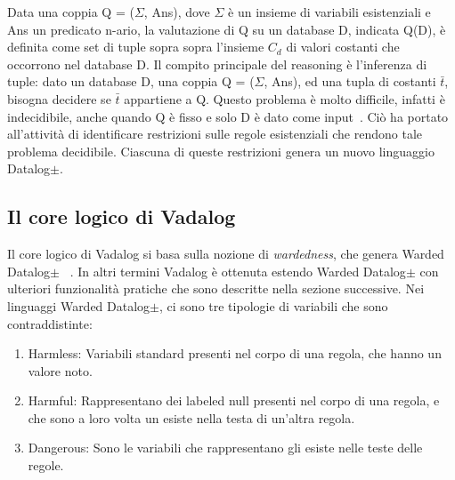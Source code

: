 Data una coppia Q = ($\Sigma$, Ans), dove $\Sigma$ è un insieme di variabili esistenziali e Ans un predicato n-ario, la valutazione di Q su un database D, indicata Q(D), è definita come set di tuple sopra sopra l'insieme $C_{d}$ di valori costanti che occorrono nel database D. \newline
Il compito principale del reasoning è l'inferenza di tuple: dato un database D, una coppia Q = ($\Sigma$, Ans), ed una tupla di costanti $\bar{t}$, bisogna decidere se $\bar{t}$ appartiene a Q. Questo problema è molto difficile, infatti è indecidibile, anche quando Q è fisso e solo D è dato come input~\cite{cali2013taming}. \newline
Ciò ha portato all'attività di identificare restrizioni sulle regole esistenziali che rendono tale problema decidibile. Ciascuna di queste restrizioni genera un nuovo linguaggio Datalog$\pm$. \newline

\subsection{Il core logico di Vadalog}

Il core logico di Vadalog si basa sulla nozione di \textit{wardedness}, che genera Warded Datalog$\pm$ ~\cite{gottlob2015beyond}. \newline
In altri termini Vadalog è ottenuta estendo Warded Datalog$\pm$ con ulteriori funzionalità pratiche che sono descritte nella sezione successive. \newline
Nei linguaggi Warded Datalog$\pm$, ci sono tre tipologie di variabili che sono contraddistinte:

\begin{enumerate}
	\item Harmless: Variabili standard presenti nel corpo di una regola, che hanno un valore noto.
	\item Harmful: Rappresentano dei labeled null presenti nel corpo di una regola, e che sono a loro volta un esiste nella testa di un'altra regola.
	\item Dangerous: Sono le variabili che rappresentano gli esiste nelle teste delle regole.
\end{enumerate}

